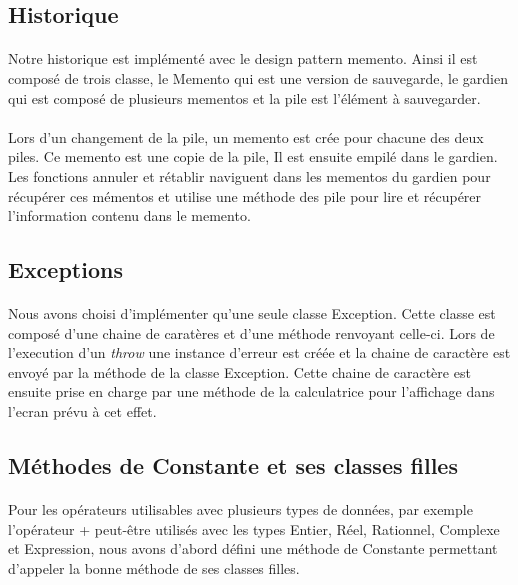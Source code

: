 \documentclass[a4paper,12pt]{article}
\begin{document}
	\subsection{Historique}
		\paragraph{}Notre historique est implémenté avec le design pattern memento. Ainsi il est composé de trois classe, le Memento qui est une version de sauvegarde, le gardien qui est composé de plusieurs mementos et la pile est l'élément à sauvegarder. 
		
		 \paragraph{}Lors d’un changement de la pile, un memento est crée pour chacune des deux piles. Ce memento est une copie de la pile, Il est ensuite empilé dans le gardien. Les fonctions annuler et rétablir naviguent dans les mementos du gardien pour récupérer ces mémentos et utilise une méthode des pile pour lire et récupérer l'information contenu dans le memento.
		 
	\subsection{Exceptions}
		\paragraph{}Nous avons choisi d'implémenter qu'une seule classe Exception. Cette classe est composé d'une chaine de caratères et d'une méthode renvoyant celle-ci. Lors de l'execution d'un \emph{throw} une instance d'erreur est créée et la chaine de caractère est envoyé par la méthode de la classe Exception. Cette chaine de caractère est ensuite prise en charge par une méthode de la calculatrice pour l'affichage dans l'ecran prévu à cet effet.
		
	\subsection{Méthodes de Constante et ses classes filles}
		\paragraph{}Pour les opérateurs utilisables avec plusieurs types de données, par exemple l'opérateur + peut-être utilisés avec les types Entier, Réel, Rationnel, Complexe et Expression, nous avons d'abord défini une méthode de Constante permettant d'appeler la bonne méthode de ses classes filles.
\end{document}
